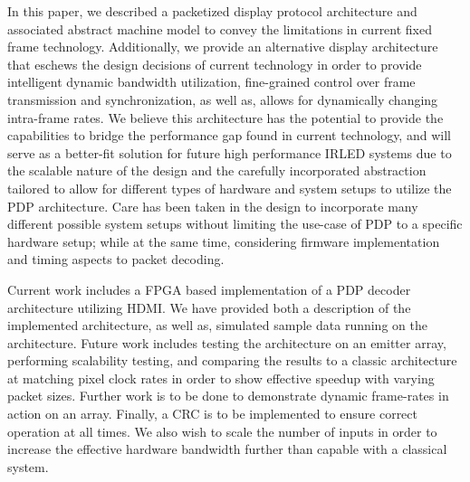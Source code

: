 \label{chap:conclusion}
In this paper, we described a packetized display protocol architecture and associated abstract machine model to convey the limitations in current fixed frame technology. Additionally, we provide an alternative display architecture that eschews the design decisions of current technology in order to provide intelligent dynamic bandwidth utilization, fine-grained control over frame transmission and synchronization, as well as, allows for dynamically changing intra-frame rates. We believe this architecture has the potential to provide the capabilities to bridge the performance gap found in current technology, and will serve as a better-fit solution for future high performance IRLED systems due to the scalable nature of the design and the carefully incorporated abstraction tailored to allow for different types of hardware and system setups to utilize the PDP architecture. Care has been taken in the design to incorporate many different possible system setups without limiting the use-case of PDP to a specific hardware setup; while at the same time, considering firmware implementation and timing aspects to packet decoding.

Current work includes a FPGA based implementation of a PDP decoder architecture utilizing HDMI. We have provided both a description of the implemented architecture, as well as, simulated sample data running on the architecture. Future work includes testing the architecture on an emitter array, performing scalability testing, and comparing the results to a classic architecture at matching pixel clock rates in order to show effective speedup with varying packet sizes. Further work is to be done to demonstrate dynamic frame-rates in action on an array. Finally, a CRC is to be implemented to ensure correct operation at all times. We also wish to scale the number of inputs in order to increase the effective hardware bandwidth further than capable with a classical system.
